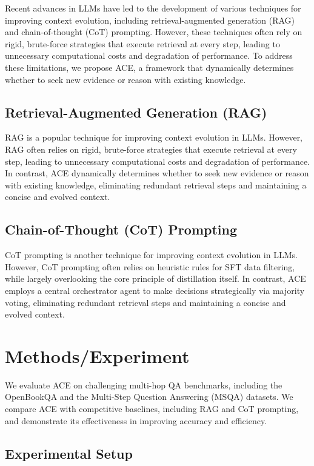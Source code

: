 \documentclass{article}
\begin{document}
Recent advances in LLMs have led to the development of various techniques for improving context evolution, including retrieval-augmented generation (RAG) and chain-of-thought (CoT) prompting. However, these techniques often rely on rigid, brute-force strategies that execute retrieval at every step, leading to unnecessary computational costs and degradation of performance. To address these limitations, we propose ACE, a framework that dynamically determines whether to seek new evidence or reason with existing knowledge.

\subsection{Retrieval-Augmented Generation (RAG)}

RAG is a popular technique for improving context evolution in LLMs. However, RAG often relies on rigid, brute-force strategies that execute retrieval at every step, leading to unnecessary computational costs and degradation of performance. In contrast, ACE dynamically determines whether to seek new evidence or reason with existing knowledge, eliminating redundant retrieval steps and maintaining a concise and evolved context.

\subsection{Chain-of-Thought (CoT) Prompting}

CoT prompting is another technique for improving context evolution in LLMs. However, CoT prompting often relies on heuristic rules for SFT data filtering, while largely overlooking the core principle of distillation itself. In contrast, ACE employs a central orchestrator agent to make decisions strategically via majority voting, eliminating redundant retrieval steps and maintaining a concise and evolved context.

\section{Methods/Experiment}

We evaluate ACE on challenging multi-hop QA benchmarks, including the OpenBookQA and the Multi-Step Question Answering (MSQA) datasets. We compare ACE with competitive baselines, including RAG and CoT prompting, and demonstrate its effectiveness in improving accuracy and efficiency.

\subsection{Experimental Setup}
\end{document}
